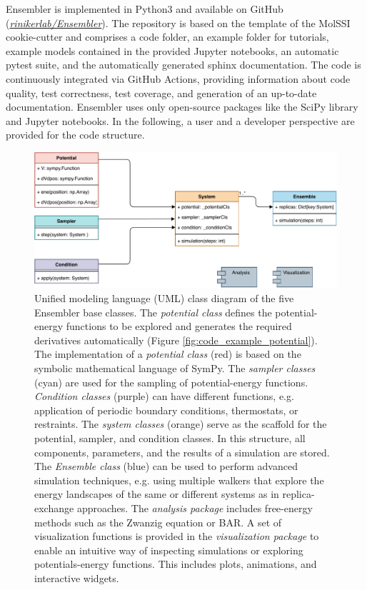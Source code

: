 
Ensembler is implemented in Python3\cite{Vanrossum2009} and available on GitHub\cite{Github2020}  (\textit{\hyperlink{https://github.com/rinikerlab/Ensembler}{rinikerlab/Ensembler}}). 
The repository is based on the template of the MolSSI cookie-cutter\cite{Naden2018} and comprises a code folder, an example folder for tutorials, example models contained in the provided Jupyter notebooks,\cite{Kluyver2016} an automatic pytest suite,\cite{Krekel2004} and the automatically generated sphinx \cite{Brandl2008} documentation. 
The code is continuously integrated via GitHub Actions,\cite{Githhubaction20} providing information about code quality, test correctness, test coverage, and generation of an up-to-date documentation. 
Ensembler uses only open-source packages like the SciPy library\cite{Virtanen2020, Vanderwalt2011, Meurer2017, Mckinney2010, Hunter2007} and Jupyter notebooks.\cite{Kluyver2016} 
In the following, a user and a developer perspective are provided for the code structure. 


\begin{figure}[h!t]
	\includegraphics[width=\textwidth]{fig/implementation/export.pdf}
	\caption{Unified modeling language (UML) class diagram of the five Ensembler base classes. The \textit{potential class} defines the potential-energy functions to be explored and generates the required derivatives automatically (Figure \ref{fig:code_example_potential}). The implementation of a \textit{potential class} (red) is based on the symbolic mathematical language of SymPy.\cite{Meurer2017} The \textit{sampler classes} (cyan) are used for the sampling of potential-energy functions. \textit{Condition classes} (purple) can have different functions, e.g. application of periodic boundary conditions,\cite{Cheatham1995, Leach2001} thermostats, or restraints. The \textit{system classes} (orange) serve as the scaffold for the potential, sampler, and condition classes. In this structure, all components, parameters, and the results of a simulation are stored. The \textit{Ensemble class} (blue) can be used to perform advanced simulation techniques, e.g. using multiple walkers that explore the energy landscapes of the same or different systems as in replica-exchange approaches.\cite{Sugita1999, Sugita2000, Yamauchi2017} The \textit{analysis package} includes free-energy methods such as the Zwanzig equation\cite{Zwanzig1954} or BAR\cite{Bennett1976}. A set of visualization functions is provided in the \textit{visualization package} to enable an intuitive way of inspecting simulations or exploring potentials-energy functions. This includes plots, animations, and interactive widgets.}
	\label{fig:UML-Diagramm}
\end{figure}


